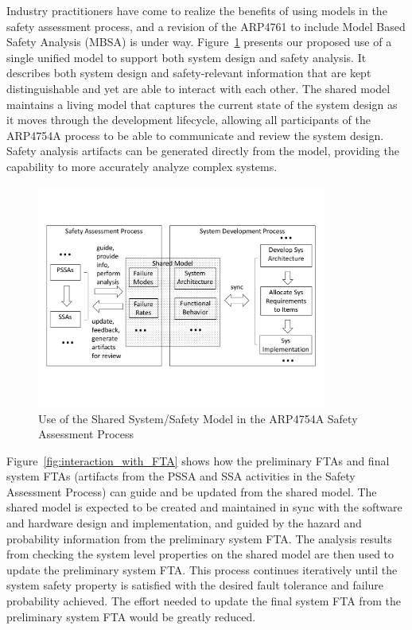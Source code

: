 Industry practitioners have come to realize the benefits of using models in the safety assessment process, and a revision of the ARP4761 to include Model Based Safety Analysis (MBSA) is under way.
Figure~\ref{fig:proposed_safety_process} presents our proposed use of a single unified model to support both system design and safety analysis. It describes both system design and safety-relevant information 
that are kept distinguishable and yet are able to interact with each other. The shared model maintains a living model that captures the current state of the system design as it moves through the development lifecycle, allowing all participants of the ARP4754A process to be able to communicate and review the system design. Safety analysis artifacts can be generated directly from the model, 
providing
the capability to more accurately analyze complex systems.

\begin{figure}[t!]
	\vspace{-0.45in}
	\centering
	\includegraphics[trim=0 9 0 5,clip,width=0.85\textwidth]{images/safety_process.pdf}
	\vspace{-0.45in}
	\caption{Use of the Shared System/Safety Model in the ARP4754A Safety Assessment Process}
	\label{fig:proposed_safety_process}
\end{figure}

Figure~\ref{fig:interaction_with_FTA} shows how the preliminary FTAs and final system FTAs (artifacts from the PSSA and SSA activities in the Safety Assessment Process) can guide and be updated from the shared model.
The shared model is expected to be created and maintained in sync with the software and hardware design and implementation, and guided by the hazard and probability information from the preliminary system FTA. The analysis results from checking the system level properties on the shared model are then used to update the preliminary system FTA. This process continues iteratively until the system safety property is satisfied with the desired fault tolerance and failure probability achieved. The effort needed to update the final system FTA from the preliminary system FTA would be greatly reduced.

